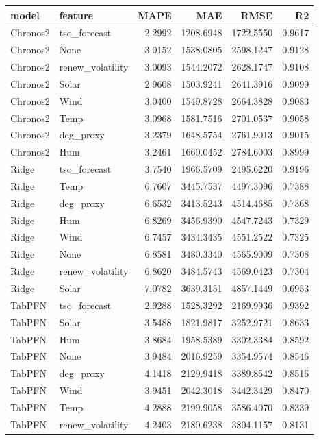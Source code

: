\begin{tabular}{llrrrr}
\toprule
model & feature & MAPE & MAE & RMSE & R2 \\
\midrule
Chronos2 & tso_forecast & 2.2992 & 1208.6948 & 1722.5550 & 0.9617 \\
Chronos2 & None & 3.0152 & 1538.0805 & 2598.1247 & 0.9128 \\
Chronos2 & renew_volatility & 3.0093 & 1544.2072 & 2628.1747 & 0.9108 \\
Chronos2 & Solar & 2.9608 & 1503.9241 & 2641.3916 & 0.9099 \\
Chronos2 & Wind & 3.0400 & 1549.8728 & 2664.3828 & 0.9083 \\
Chronos2 & Temp & 3.0968 & 1581.7516 & 2701.0537 & 0.9058 \\
Chronos2 & deg_proxy & 3.2379 & 1648.5754 & 2761.9013 & 0.9015 \\
Chronos2 & Hum & 3.2461 & 1660.0452 & 2784.6003 & 0.8999 \\
Ridge & tso_forecast & 3.7540 & 1966.5709 & 2495.6220 & 0.9196 \\
Ridge & Temp & 6.7607 & 3445.7537 & 4497.3096 & 0.7388 \\
Ridge & deg_proxy & 6.6532 & 3413.5243 & 4514.4685 & 0.7368 \\
Ridge & Hum & 6.8269 & 3456.9390 & 4547.7243 & 0.7329 \\
Ridge & Wind & 6.7457 & 3434.3435 & 4551.2522 & 0.7325 \\
Ridge & None & 6.8581 & 3480.3340 & 4565.9009 & 0.7308 \\
Ridge & renew_volatility & 6.8620 & 3484.5743 & 4569.0423 & 0.7304 \\
Ridge & Solar & 7.0782 & 3639.3151 & 4857.1449 & 0.6953 \\
TabPFN & tso_forecast & 2.9288 & 1528.3292 & 2169.9936 & 0.9392 \\
TabPFN & Solar & 3.5488 & 1821.9817 & 3252.9721 & 0.8633 \\
TabPFN & Hum & 3.8684 & 1958.5389 & 3302.3384 & 0.8592 \\
TabPFN & None & 3.9484 & 2016.9259 & 3354.9574 & 0.8546 \\
TabPFN & deg_proxy & 4.1418 & 2129.9418 & 3389.8542 & 0.8516 \\
TabPFN & Wind & 3.9451 & 2042.3018 & 3442.3429 & 0.8470 \\
TabPFN & Temp & 4.2888 & 2199.9058 & 3586.4070 & 0.8339 \\
TabPFN & renew_volatility & 4.2403 & 2180.6238 & 3804.1157 & 0.8131 \\
\bottomrule
\end{tabular}
